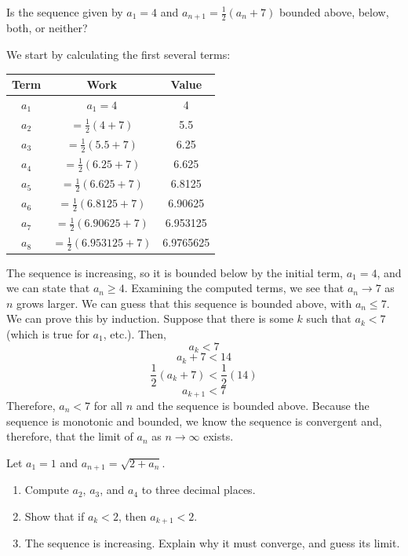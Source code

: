 \begin{Worked}
\begin{Problem}
Is the sequence given by $a_1 = 4$ and $a_{n+1} = \frac{1}{2}
    (a_n + 7)$ bounded above, below, both, or neither?
\end{Problem}
\begin{Solution}
We start by calculating the first several terms:
\begin{center}
    \begin{tabular}{|c|c|c|}\hline
        Term  & Work                       & Value     \\
        \hline
        $a_1$ & $a_1 = 4$                  & 4         \\
        \hline
        $a_2$ & $=\frac{1}{2}(4 + 7)$      & 5.5       \\
        \hline
        $a_3$ & $=\frac{1}{2}(5.5+7)$      & 6.25      \\
        \hline
        $a_4$ & $=\frac{1}{2}(6.25+7)$     & 6.625     \\
        \hline
        $a_5$ & $=\frac{1}{2}(6.625+7)$    & 6.8125    \\
        \hline
        $a_6$ & $=\frac{1}{2}(6.8125+7)$   & 6.90625   \\
        \hline
        $a_7$ & $=\frac{1}{2}(6.90625+7)$  & 6.953125  \\
        \hline
        $a_8$ & $=\frac{1}{2}(6.953125+7)$ & 6.9765625 \\
        \hline
    \end{tabular}
\end{center}

The sequence is increasing, so it is bounded below by the initial term, $a_1 =
    4$, and we can state that $a_n \geq 4$. Examining the computed terms, we see
that $a_n \to 7$ as $n$ grows larger. We can guess that this sequence is
bounded above, with $a_n \leq 7$. We can prove this by induction. Suppose that
there is some $k$ such that $a_k < 7$ (which is true for $a_1$, etc.). Then,
$$a_k < 7$$
$$a_k + 7 < 14$$
$$\frac{1}{2}(a_k + 7) < \frac{1}{2}(14)$$
$$a_{k + 1} < 7$$
Therefore, $a_n < 7$ for all $n$ and the sequence is bounded above. Because
the sequence is monotonic and bounded, we know the sequence is convergent and,
therefore, that the limit of $a_n$ as $n \to \infty$ exists.
\end{Solution}
\end{Worked}

\begin{Exercise}[label=seqcalc4]
    Let $a_1 = 1$ and $a_{n+1} = \sqrt{2 + a_n}$.
    \begin{enumerate}
        \item Compute $a_2$, $a_3$, and $a_4$ to three decimal places.
        \item Show that if $a_k < 2$, then $a_{k+1} < 2$.
        \item The sequence is increasing. Explain why it must converge, and
        guess its limit.
    \end{enumerate}
\end{Exercise}

